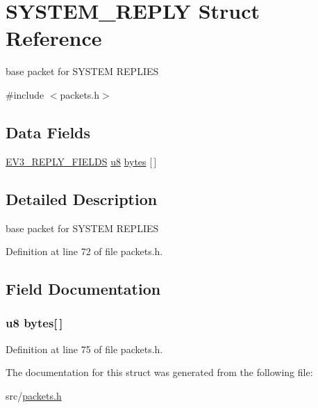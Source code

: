 \hypertarget{struct_s_y_s_t_e_m___r_e_p_l_y}{}\section{S\+Y\+S\+T\+E\+M\+\_\+\+R\+E\+P\+L\+Y Struct Reference}
\label{struct_s_y_s_t_e_m___r_e_p_l_y}


base packet for S\+Y\+S\+T\+E\+M R\+E\+P\+L\+I\+E\+S  




{\ttfamily \#include $<$packets.\+h$>$}

\subsection*{Data Fields}
\begin{DoxyCompactItemize}
\item 
\hyperlink{packets_8h_a382c165d520d462ac8f0c88e2a1970cb}{E\+V3\+\_\+\+R\+E\+P\+L\+Y\+\_\+\+F\+I\+E\+L\+D\+S} \hyperlink{defs_8h_a92c50087ca0e64fa93fc59402c55f8ca}{u8} \hyperlink{struct_s_y_s_t_e_m___r_e_p_l_y_aca67a2a7a200b0c2fa5e935065359910}{bytes} \mbox{[}$\,$\mbox{]}
\end{DoxyCompactItemize}


\subsection{Detailed Description}
base packet for S\+Y\+S\+T\+E\+M R\+E\+P\+L\+I\+E\+S 

Definition at line 72 of file packets.\+h.



\subsection{Field Documentation}
\hypertarget{struct_s_y_s_t_e_m___r_e_p_l_y_aca67a2a7a200b0c2fa5e935065359910}{}
\subsubsection[{bytes}]{ {\bf u8} bytes\mbox{[}$\,$\mbox{]}}\label{struct_s_y_s_t_e_m___r_e_p_l_y_aca67a2a7a200b0c2fa5e935065359910}


Definition at line 75 of file packets.\+h.



The documentation for this struct was generated from the following file\+:\begin{DoxyCompactItemize}
\item 
src/\hyperlink{packets_8h}{packets.\+h}\end{DoxyCompactItemize}
